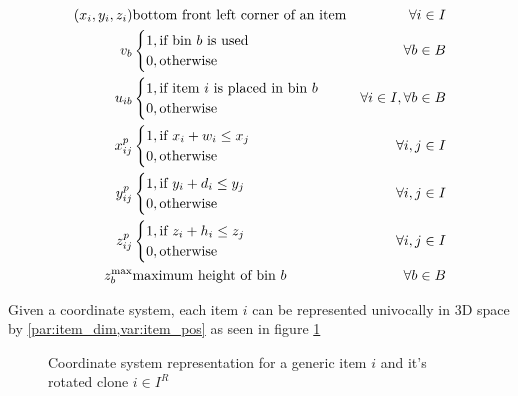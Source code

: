 \begin{eqnarray}
              (x_i,y_i,z_i) & \text{bottom front left corner of an item} & \forall i \in I \label{var:item_pos} \\
                    v_{b} & \begin{cases}
                                            1, \text{if bin $b$ is used} \\ 
                                            0, \text{otherwise}
                                        \end{cases} & \forall b \in B \notag \\
                    u_{ib} & \begin{cases}
                                            1, \text{if item $i$ is placed in bin $b$} \\ 
                                            0, \text{otherwise}
                                        \end{cases} & \forall i \in I, \forall b \in B  \notag \\
                    x^p_{ij} & \begin{cases}
                                            1, \text{if $x_i + w_i \le x_j$} \\ 
                                            0, \text{otherwise}
                                        \end{cases} & \forall i,j \in I \notag \\
                    y^p_{ij} & \begin{cases}
                                            1, \text{if $y_i + d_i \le y_j$} \\ 
                                            0, \text{otherwise}
                                        \end{cases} & \forall i,j \in I \notag \\
                    z^p_{ij} & \begin{cases}
                                            1, \text{if $z_i + h_i \le z_j$} \\ 
                                            0, \text{otherwise}
                                        \end{cases} & \forall i,j \in I \notag \\
            z_b^\text{max} & \text{maximum height of bin $b$} & \forall b \in B \notag
\end{eqnarray}

Given a coordinate system, each item $i$ can be represented univocally in 3D space by \cref{par:item_dim,var:item_pos} as seen in figure \ref{fig:coordinate_system}
\begin{figure}
    \scalebox{0.65}{%
    
    }
    \caption{Coordinate system representation for a generic item $i$ and it's rotated clone $i \in I^R$ 
    \label{fig:coordinate_system}}
\end{figure}

